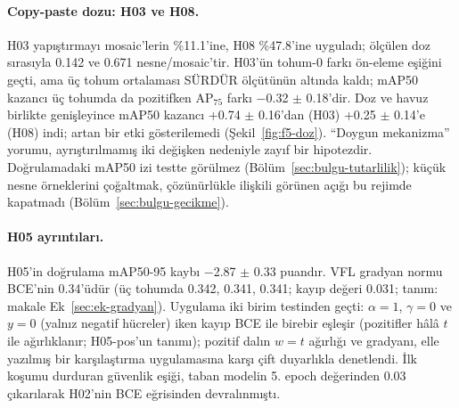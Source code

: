 \paragraph{Copy-paste dozu: H03 ve H08.}
H03 yapıştırmayı mosaic'lerin \%11.1'ine, H08 \%47.8'ine uyguladı; ölçülen doz sırasıyla 0.142 ve 0.671 nesne/mosaic'tir. H03'ün tohum-0 farkı ön-eleme eşiğini geçti, ama üç tohum ortalaması SÜRDÜR ölçütünün altında kaldı; mAP50 kazancı üç tohumda da pozitifken AP$_{75}$ farkı $-$0.32 $\pm$ 0.18'dir. Doz ve havuz birlikte genişleyince mAP50 kazancı +0.74 $\pm$ 0.16'dan (H03) +0.25 $\pm$ 0.14'e (H08) indi; artan bir etki gösterilemedi (Şekil~\ref{fig:f5-doz}). ``Doygun mekanizma'' yorumu, ayrıştırılmamış iki değişken nedeniyle zayıf bir hipotezdir. Doğrulamadaki mAP50 izi testte görülmez (Bölüm~\ref{sec:bulgu-tutarlilik}); küçük nesne örneklerini çoğaltmak, çözünürlükle ilişkili görünen açığı bu rejimde kapatmadı (Bölüm~\ref{sec:bulgu-gecikme}).

\paragraph{H05 ayrıntıları.}
H05'in doğrulama mAP50-95 kaybı $-$2.87 $\pm$ 0.33 puandır. VFL gradyan normu BCE'nin 0.34'üdür (üç tohumda 0.342, 0.341, 0.341; kayıp değeri 0.031; tanım: makale Ek~\ref{sec:ek-gradyan}). Uygulama iki birim testinden geçti: $\alpha=1$, $\gamma=0$ ve $y=0$ (yalnız negatif hücreler) iken kayıp BCE ile birebir eşleşir (pozitifler hâlâ $t$ ile ağırlıklanır; H05-pos'un tanımı); pozitif dalın $w=t$ ağırlığı ve gradyanı, elle yazılmış bir karşılaştırma uygulamasına karşı çift duyarlıkla denetlendi. İlk koşumu durduran güvenlik eşiği, taban modelin 5. epoch değerinden 0.03 çıkarılarak H02'nin BCE eğrisinden devralınmıştı.

